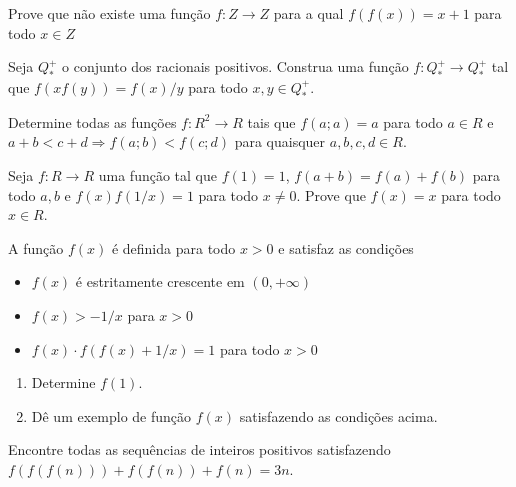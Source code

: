 \begin{questao}
  Prove que não existe uma função $f: Z \rightarrow Z$ para a qual $f(f(x)) =
  x+1$ para todo $x \in Z$
\end{questao}

\begin{questao}
  Seja $Q^+_*$ o conjunto dos racionais positivos. Construa uma função $f: Q^+_*
  \rightarrow Q^+_*$ tal que $f(xf(y)) = f(x)/y$ para todo $x,y \in {Q^+_*}$.
\end{questao}

\begin{questao}
  Determine todas as funções $f:R^2 \rightarrow R$ tais que $f(a;a)=a$ para todo
  $a \in R$ e $a+b<c+d \Rightarrow f(a;b) < f(c;d)$ para quaisquer $a,b,c,d \in
  R$.
\end{questao}

\begin{questao}
  Seja $f: R \rightarrow R$ uma função tal que $f(1)=1$, $f(a+b)=f(a)+f(b)$ para
  todo $a,b$ e $f(x)f(1/x)=1$ para todo $x \not= 0$. Prove que $f(x)=x$ para
  todo $x \in R$.
\end{questao}

\begin{questao}
  A função $f(x)$ é definida para todo $x>0$ e satisfaz as condições

  \begin{itemize}[itemsep=1ex, leftmargin=1cm]

  \item $f(x)$ é estritamente crescente em $(0,+\infty)$

  \item $f(x) > -1/x$ para $x>0$

  \item $f(x) \cdot f(f(x)+1/x) = 1$ para todo $x>0$
  \end{itemize}


  \begin{enumerate}

  \item Determine $f(1)$.

  \item Dê um exemplo de função $f(x)$ satisfazendo as condições acima.
  \end{enumerate}

\end{questao}

\begin{questao}
  Encontre todas as sequências de inteiros positivos satisfazendo $f(f(f(n))) +
  f(f(n)) + f(n) = 3n$.
\end{questao}

